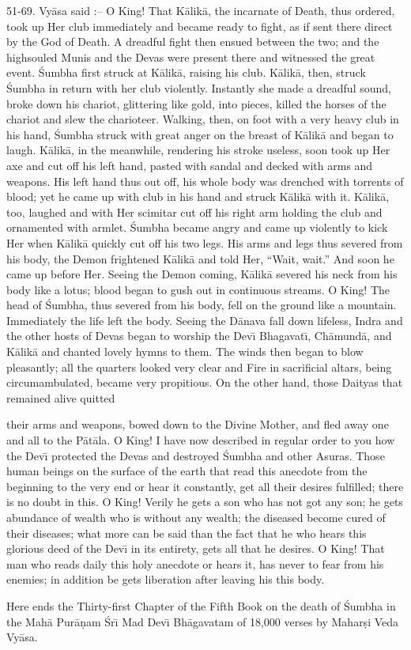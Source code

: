 51-69. Vy\=asa said :-- O King! That K\=alik\=a, the incarnate of Death, thus ordered, took up Her club immediately and became ready to fight, as if sent there direct by the God of Death. A dreadful fight then ensued between the two; and the highsouled Munis and the Devas were present there and witnessed the great event. \'Sumbha first struck at K\=alik\=a, raising his club. K\=alik\=a, then, struck \'Sumbha in return with her club violently. Instantly she made a dreadful sound, broke down his chariot, glittering like gold, into pieces, killed the horses of the chariot and slew the charioteer. Walking, then, on foot with a very heavy club in his hand, \'Sumbha struck with great anger on the breast of K\=alik\=a and began to laugh. K\=alik\=a, in the meanwhile, rendering his stroke useless, soon took up Her axe and cut off his left hand, pasted with sandal and decked with arms and weapons. His left hand thus out off, his whole body was drenched with torrents of blood; yet he came up with club in his hand and struck K\=alik\=a with it. K\=alik\=a, too, laughed and with Her scimitar cut off his right arm holding the club and ornamented with armlet. \'Sumbha became angry and came up violently to kick Her when K\=alik\=a quickly cut off his two legs. His arms and legs thus severed from his body, the Demon frightened K\=alik\=a and told Her, ``Wait, wait.'' And soon he came up before Her. Seeing the Demon coming, K\=alik\=a severed his neck from his body like a lotus; blood began to gush out in continuous streams. O King! The head of \'Sumbha, thus severed from his body, fell on the ground like a mountain. Immediately the life left the body. Seeing the D\=anava fall down lifeless, Indra and the other hosts of Devas began to worship the Dev\={\i} Bhagavat\={\i}, Ch\=amund\=a, and K\=alik\=a and chanted lovely hymns to them. The winds then began to blow pleasantly; all the quarters looked very clear and Fire in sacrificial altars, being circumambulated, became very propitious. On the other hand, those Daityas that remained alive quitted

their arms and weapons, bowed down to the Divine Mother, and fled away one and all to the P\=at\=ala. O King! I have now described in regular order to you how the Dev\={\i} protected the Devas and destroyed \'Sumbha and other Asuras. Those human beings on the surface of the earth that read this anecdote from the beginning to the very end or hear it constantly, get all their desires fulfilled; there is no doubt in this. O King! Verily he gets a son who has not got any son; he gets abundance of wealth who is without any wealth; the diseased become cured of their diseases; what more can be said than the fact that he who hears this glorious deed of the Dev\={\i} in its entirety, gets all that he desires. O King! That man who reads daily this holy anecdote or hears it, has never to fear from his enemies; in addition be gets liberation after leaving his this body.

Here ends the Thirty-first Chapter of the Fifth Book on the death of \'Sumbha in the Mah\=a Pur\=a\d{n}am \'Sr\={\i} Mad Dev\={\i} Bh\=agavatam of 18,000 verses by Mahar\d{s}i Veda Vy\=asa.



